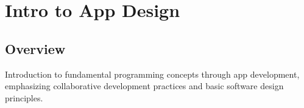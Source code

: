 \chapter{Intro to App Design}

\section*{Overview}
Introduction to fundamental programming concepts through app development, emphasizing collaborative development practices and basic software design principles.

